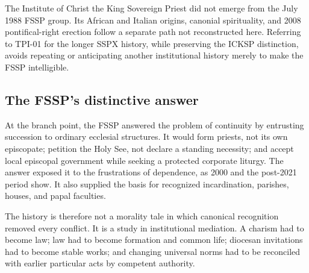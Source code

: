 The Institute of Christ the King Sovereign Priest did not emerge from the July 1988 FSSP group. Its African and Italian origins, canonial spirituality, and 2008 pontifical-right erection follow a separate path not reconstructed here. Referring to TPI-01 for the longer SSPX history, while preserving the ICKSP distinction, avoids repeating or anticipating another institutional history merely to make the FSSP intelligible.

\subsection{The FSSP's distinctive answer}

At the branch point, the FSSP answered the problem of continuity by entrusting succession to ordinary ecclesial structures. It would form priests, not its own episcopate; petition the Holy See, not declare a standing necessity; and accept local episcopal government while seeking a protected corporate liturgy. The answer exposed it to the frustrations of dependence, as 2000 and the post-2021 period show. It also supplied the basis for recognized incardination, parishes, houses, and papal faculties.

The history is therefore not a morality tale in which canonical recognition removed every conflict. It is a study in institutional mediation. A charism had to become law; law had to become formation and common life; diocesan invitations had to become stable works; and changing universal norms had to be reconciled with earlier particular acts by competent authority.
